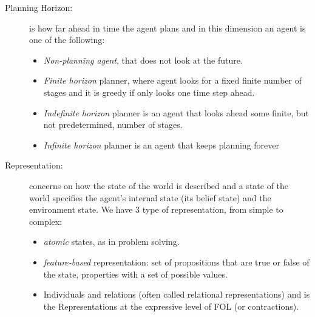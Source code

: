 \begin{description}
    \item [Planning Horizon: ] is how far ahead in time the agent plans and in this dimension an agent
                               is one of the following:
                               \begin{itemize}
                                    \item \emph{Non-planning agent}, that does not look at the future.
                                    \item \emph{Finite horizon} planner, where agent looks for a fixed finite
                                          number of stages and it is greedy if only looks one time step ahead.
                                    \item \emph{Indefinite horizon} planner is an agent that looks ahead some finite,
                                          but not predetermined, number of stages.
                                    \item \emph{Infinite horizon} planner is an agent that keeps planning forever
                               \end{itemize}
    \item [Representation: ] concerns on how the state of the world is described and a state of the world
                             specifies the agent’s internal state (its belief state) and the environment state.\newline
                             We have $3$ type of representation, from simple to complex:
                             \begin{itemize}
                                \item \emph{atomic} states, as in problem solving.
                                \item \emph{feature-based} representation: set of propositions that are true or
                                      false of the state, properties with a set of possible values. 
                                \item Individuals and relations (often called relational representations) and 
                                      is the Representations at the expressive level of FOL (or contractions).
                             \end{itemize}


\end{description}
